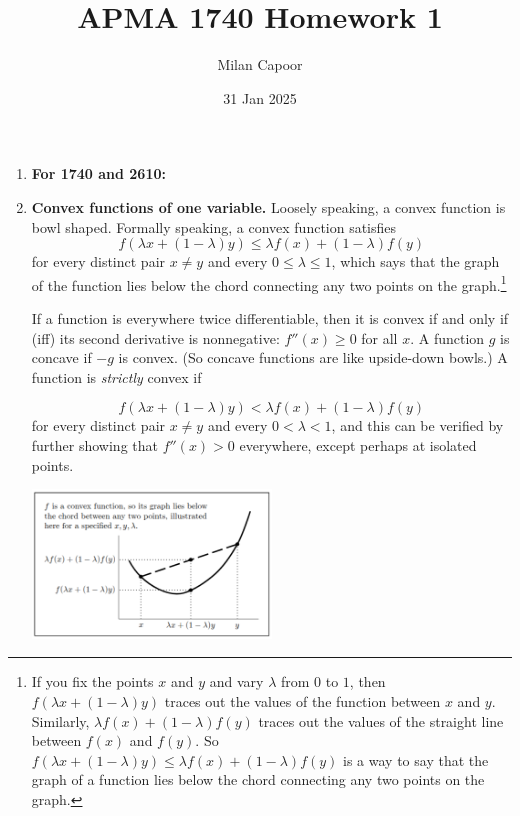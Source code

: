 \documentclass[12pt]{article}
\title{APMA 1740 Homework 1}
\author{Milan Capoor}
\date{31 Jan 2025}
\begin{document}
\maketitle

\begin{enumerate}[1.]

	\item[] \hspace{-3ex} {\bf For 1740 and 2610:}

	\item {\bf Convex functions of one variable.} Loosely speaking, a convex function is bowl shaped. Formally speaking, a convex function satisfies \[ f(\lambda x + (1-\lambda)y) \leq \lambda f(x)+(1-\lambda)f(y) \] for every distinct pair $x\neq y$ and every $0\leq \lambda\leq 1$, which says that the graph of the function lies below the chord connecting any two points on the graph.\footnote{If you fix the points $x$ and $y$ and vary $\lambda$ from $0$ to $1$, then $f(\lambda x + (1-\lambda)y)$ traces out the values of the function between $x$ and $y$. Similarly, $\lambda f(x)+(1-\lambda)f(y)$ traces out the values of the straight line between $f(x)$ and $f(y)$. So $f(\lambda x + (1-\lambda)y) \leq \lambda f(x)+(1-\lambda)f(y)$ is a way to say that the graph of a function lies below the chord connecting any two points on the graph.}

	      If a function is everywhere twice differentiable, then it is convex if and only if (iff) its second derivative is nonnegative: $f''(x)\geq 0$ for all $x$. A function $g$ is concave if $-g$ is convex. (So concave functions are like upside-down bowls.) A function is {\em strictly} convex if

	      \[ f(\lambda x + (1-\lambda)y) < \lambda f(x)+(1-\lambda)f(y) \]
	      for every distinct pair $x\neq y$ and every $0 < \lambda < 1$, and this can be verified by further showing that $f''(x)>0$ everywhere, except perhaps at isolated points.

	      \begin{center}
		      \includegraphics[width=0.5\textwidth]{Images/HW1-convex.png}
	      \end{center}


\end{enumerate}
\end{document}
